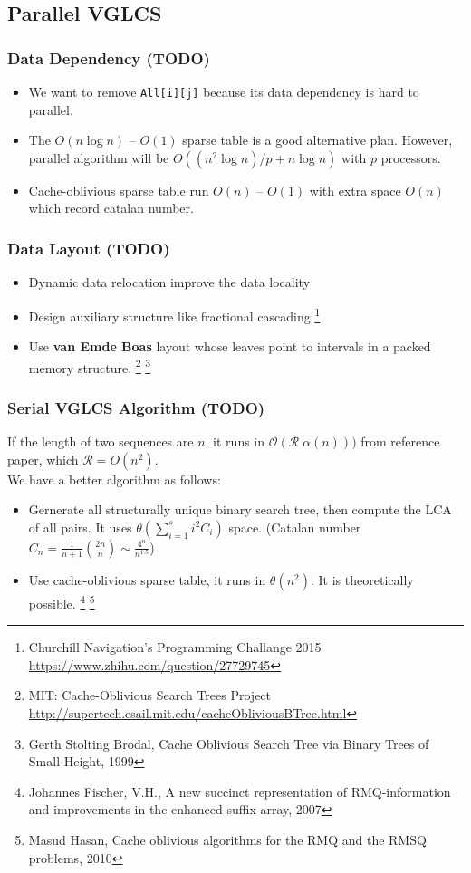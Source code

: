 \subsection{Parallel VGLCS}
\begin{frame}
	\frametitle{Data Dependency (TODO)}
	\begin{itemize}
		\setlength\itemsep{1em}
		\item We want to remove \texttt{All[i][j]} because its data dependency 
			is hard to parallel.
		\item The $O(n \log n)$ -- $O(1)$ sparse table is a good alternative plan. 
			However, parallel algorithm will be $O((n^2 \log n) / p + n \log n)$ with $p$ processors.
		\item Cache-oblivious sparse table run $O(n)$ -- $O(1)$ 
			with extra space $O(n)$ which record catalan number.
	\end{itemize}
\end{frame}

\begin{frame}
	\frametitle{Data Layout (TODO)}
	\begin{itemize}
		\setlength\itemsep{1em}
		\item Dynamic data relocation improve the data locality
		\item Design auxiliary structure like fractional cascading
		\footnote{Churchill Navigation's Programming Challange 2015 \url{https://www.zhihu.com/question/27729745}}
		\item Use \textbf{van Emde Boas} layout whose leaves point to intervals in a packed memory structure.
		\footnote{MIT: Cache-Oblivious Search Trees Project \url{http://supertech.csail.mit.edu/cacheObliviousBTree.html}}
		\footnote{Gerth Stolting Brodal, Cache Oblivious Search Tree via Binary Trees of Small Height, 1999}
	\end{itemize}
\end{frame}

\begin{frame}
	\frametitle{Serial VGLCS Algorithm (TODO)}
	If the length of two sequences are $n$, it runs in $\mathcal{O}(\mathcal{R} \; \alpha(n)))$ 
	from reference paper, which $\mathcal{R} = O(n^2)$. \\

	We have a better algorithm as follows:
	\begin{itemize}
		\setlength\itemsep{1em}
		\item Gernerate all structurally unique binary search tree, then compute the LCA of all pairs. 
			It uses $\theta(\sum_{i = 1}^{s} i^2 C_i)$ space.
			(Catalan number $C_n = \frac{1}{n+1} \binom{2n}{n} \sim \frac{4^n}{n^{1.5}}$)
		\item Use cache-oblivious sparse table, it runs in $\mathcal{\theta}(n^2)$.
			It is theoretically possible.
		\footnote{Johannes Fischer, V.H., A new succinct representation of 
				RMQ-information and improvements in the enhanced suffix array, 2007}
		\footnote{Masud Hasan, Cache oblivious algorithms for the RMQ and the RMSQ problems, 2010}
	\end{itemize}
\end{frame}

